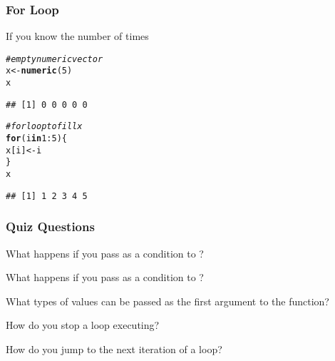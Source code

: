 \documentclass[12pt]{beamer}\usepackage[]{graphicx}\usepackage[]{color}
\makeatletter
\newcommand{\hlnum}[1]{\textcolor[rgb]{0.686,0.059,0.569}{#1}}%
\newcommand{\hlcom}[1]{\textcolor[rgb]{0.678,0.584,0.686}{\textit{#1}}}%
\newcommand{\hlopt}[1]{\textcolor[rgb]{0,0,0}{#1}}%
\newcommand{\hlstd}[1]{\textcolor[rgb]{0.345,0.345,0.345}{#1}}%
\newcommand{\hlkwa}[1]{\textcolor[rgb]{0.161,0.373,0.58}{\textbf{#1}}}%
\newcommand{\hlkwb}[1]{\textcolor[rgb]{0.69,0.353,0.396}{#1}}%
\newcommand{\hlkwd}[1]{\textcolor[rgb]{0.737,0.353,0.396}{\textbf{#1}}}%
\newenvironment{kframe}{%
 \def\at@end@of@kframe{}%
 \ifinner\ifhmode%
  \def\at@end@of@kframe{\end{minipage}}%
  \begin{minipage}{\columnwidth}%
 \fi\fi%
 \def\FrameCommand##1{\hskip\@totalleftmargin \hskip-\fboxsep
 \colorbox{shadecolor}{##1}\hskip-\fboxsep
     \hskip-\linewidth \hskip-\@totalleftmargin \hskip\columnwidth}%
 \MakeFramed {\advance\hsize-\width
   \@totalleftmargin\z@ \linewidth\hsize
   \@setminipage}}%
 {\par\unskip\endMakeFramed%
 \at@end@of@kframe}
\newenvironment{knitrout}{}{} %
\makeatother
\begin{document}
\begin{frame}[fragile]
\frametitle{For Loop}

If you know the number of times
\begin{knitrout}\footnotesize
{}\color{fgcolor}\begin{kframe}
\begin{alltt}
\hlcom{# empty numeric vector}
\hlstd{x} \hlkwb{<-} \hlkwd{numeric}\hlstd{(}\hlnum{5}\hlstd{)}
\hlstd{x}
\end{alltt}
\begin{verbatim}
## [1] 0 0 0 0 0
\end{verbatim}
\begin{alltt}
\hlcom{# for loop to fill x}
\hlkwa{for} \hlstd{(i} \hlkwa{in} \hlnum{1}\hlopt{:}\hlnum{5}\hlstd{) \{}
  \hlstd{x[i]} \hlkwb{<-} \hlstd{i}
\hlstd{\}}
\hlstd{x}
\end{alltt}
\begin{verbatim}
## [1] 1 2 3 4 5
\end{verbatim}
\end{kframe}
\end{knitrout}

\end{frame}


\begin{frame}
\frametitle{Quiz Questions}

\bbi
  \item What happens if you pass  as a condition to ?
  \item What happens if you pass  as a condition to ?
  \item What types of values can be passed as the first argument to the  function?
  \item How do you stop a  loop executing?
  \item How do you jump to the next iteration of a loop?
\ei

\end{frame}

\end{document}
